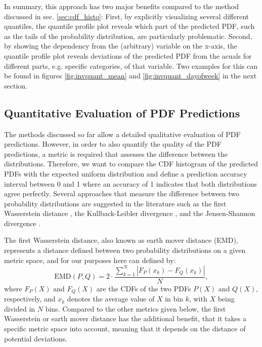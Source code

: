\documentclass[BCOR=1mm, DIV=calc,10pt,
twoside=true,
twocolumn,
headings=normal]{scrartcl}
\begin{document}
In summary, this approach has two major benefits compared to the method discussed in sec. \ref{sec:cdf_histo}: First, by explicitly visualizing several different quantiles, the quantile profile plot reveals which part of the predicted PDF, such as the tails of the probability distribution, are particularly problematic. Second, by showing the dependency from the (arbitrary) variable on the x-axis, the quantile profile plot reveals deviations of the predicted PDF from the acuals for different parts, e.g. specific categories, of that variable. Two examples for this can be found in figures \ref{fig:invquant_mean} and \ref{fig:invquant_dayofweek} in the next section.

\subsection{Quantitative Evaluation of PDF Predictions}
\label{sec:cdf_acc}

The methods discussed  so far allow a detailed qualitative evaluation of PDF predictions. However, in order to also quantify the quality of the PDF predictions, a metric is required that assesses the difference between the distributions. Therefore, we want to compare the CDF histogram of the predicted PDFs with the expected  uniform distribution and define a prediction accuracy interval between 0 and 1 where an accuracy of 1 indicates that both distributions agree perfectly. Several approaches that measure the difference between two probability distributions are suggested in the literature such as  the first Wasserstein distance \cite{olkin1982}, the Kullback-Leibler divergence \cite{kullback1951}, and the Jensen-Shannon divergence  \cite{dagan1997}.

The first Wasserstein distance, also known as earth mover distance (EMD), represents a distance  defined between two probability distributions on a given metric space, and for our purposes here can defined by:
\begin{equation}
\text{EMD}(P, Q) = 2 \cdot \frac{\sum_{k=1}^N |F_P(x_k) - F_Q(x_k)|}{N},
\end{equation}
where $F_P(X)$ and $F_Q(X)$ are the CDFs of the two PDFs $P(X)$ and $Q(X)$, respectively, and $x_k$ denotes the average value of $X$ in bin $k$, with $X$ being divided in $N$ bins. Compared to the other metrics given below, the first Wasserstein or earth mover distance has the additional benefit, that it takes a specific metric space into account, meaning that it depends on the distance of potential deviations.
\end{document}
